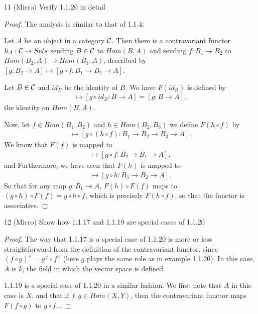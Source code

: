 \begin{exercise}{11 (Micro)}
Verify 1.1.20 in detail
\end{exercise}
\begin{proof}
The analysis is similar to that of 1.1.4:

Let $A$ be an object in a category $\mathcal{C}$.
Then there is a contravariant functor $h_A: \mathcal{C} \to Sets$ sending $B \in \mathcal{C}$ to $Hom(B, A)$ and sending $f: B_1 \to B_2$ to $Hom(B_2, A) \to Hom(B_1, A)$, described by $[g: B_2 \to A] \mapsto [g \circ f: B_1 \to B_2 \to A]$.

Let $B \in \mathcal{C}$ and $id_B$ be the identity of $B$. 
We have $F(id_B)$ is defined by 
\begin{align*}
    [g: B \to A] \mapsto [g \circ id_B: B \to A] = [g: B \to A],
\end{align*}
the identity on $Hom(B, A)$.

Now, let $f \in Hom(B_1, B_2)$ and $h \in Hom(B_2, B_3)$ we define $F(h \circ f)$ by 
\begin{align*}
    [g: B_3 \to A] \mapsto [g \circ (h \circ f) : B_1 \to B_2 \to B_3 \to A].
\end{align*}
We know that $F(f)$ is mapped to 
\begin{align*}
    [g: B_1 \to A] \mapsto [g \circ f: B_2 \to B_1 \to A],
\end{align*}
and 
Furthermore, we have seen that $F(h)$ is mapped to 
\begin{align*}
    [g: B_2 \to A] \mapsto [g \circ h: B_3 \to B_2 \to A].
\end{align*}
So that for any map $g: B_1 \to A$, $F(h) \circ F(f)$ maps to $(g \circ h) \circ F(f) = g \circ h \circ f$, which is precisely $F(h \circ f)$, so that the functor is associative.
\end{proof} 

\begin{exercise}{12 (Micro)}
Show how 1.1.17 and 1.1.19 are special cases of 1.1.20
\end{exercise}
\begin{proof}
The way that 1.1.17 is a special case of 1.1.20 is more or less straightforward from the definition of the contravariant functor, since $(f \circ g)^\lor = g^\lor \circ f^\lor$ (here $g$ plays the same role as in example 1.1.20).
In this case, $A$ is $k$, the field in which the vector space is defined.

1.1.19 is a special case of 1.1.20 in a similar fashion.
We first note that $A$ in this case is $X$, and that if $f, g \in Hom(X, Y)$, then the contravariant functor maps $F(f \circ g)$ to $g \circ f$...
\end{proof} 

